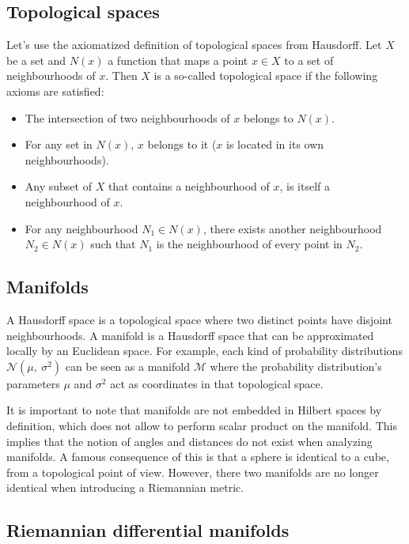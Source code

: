 \documentclass[a4paper,11pt]{report}
\begin{document}
\subsection{Topological spaces}

Let's use the axiomatized definition of topological spaces from Hausdorff.
Let $X$ be a set and $N(x)$ a function that maps a point $x \in X$ to a set of neighbourhoods of $x$.
Then $X$ is a so-called topological space if the following axioms are satisfied:
\begin{itemize}
  \item The intersection of two neighbourhoods of $x$ belongs to $N(x)$.
  \item For any set in $N(x)$, $x$ belongs to it ($x$ is located in its own neighbourhoods).
  \item Any subset of $X$ that contains a neighbourhood of $x$, is itself a neighbourhood of $x$.
  \item For any neighbourhood $N_1 \in N(x)$, there exists another neighbourhood $N_2 \in N(x)$
  such that $N_1$ is the neighbourhood of every point in $N_2$.
\end{itemize}

\subsection{Manifolds}

A Hausdorff space is a topological space where two distinct points have disjoint neighbourhoods.
A manifold is a Hausdorff space that can be approximated locally by an Euclidean space. For example, each kind of probability distributions $\mathcal{N}(\mu,\ \sigma^2)$ can be seen as a manifold $\mathcal{M}$ where the probability distribution's parameters $\mu$ and $\sigma^2$ act as coordinates in that topological space.

It is important to note that manifolds are not embedded in Hilbert spaces by definition, which does not allow to perform scalar product on the manifold.
This implies that the notion of angles and distances do not exist when analyzing manifolds. A famous consequence of this is that a sphere is identical
to a cube, from a topological point of view. However, there two manifolds are no longer identical when introducing a Riemannian metric.

\subsection{Riemannian differential manifolds}
\end{document}
